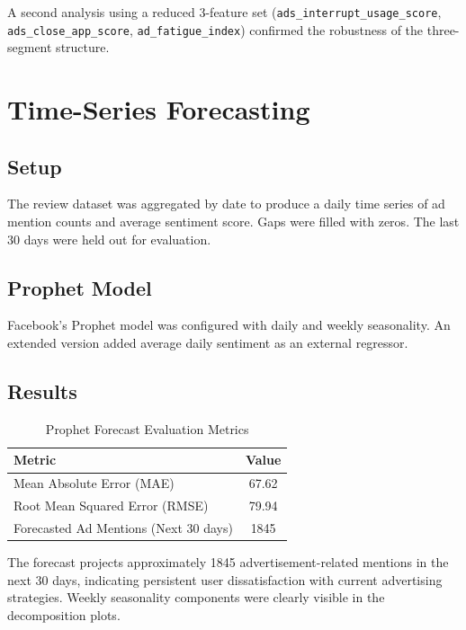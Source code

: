 \documentclass[12pt]{article}
\begin{document}
A second analysis using a reduced 3-feature set (\texttt{ads\_interrupt\_usage\_score}, \texttt{ads\_close\_app\_score}, \texttt{ad\_fatigue\_index}) confirmed the robustness of the three-segment structure.

\section{Time-Series Forecasting}

\subsection{Setup}

The review dataset was aggregated by date to produce a daily time series of ad mention counts and average sentiment score. Gaps were filled with zeros. The last 30 days were held out for evaluation.

\subsection{Prophet Model}

Facebook's Prophet model was configured with daily and weekly seasonality. An extended version added average daily sentiment as an external regressor.

\subsection{Results}

\begin{table}[H]
\centering
\begin{tabular}{lc}
\toprule
\textbf{Metric} & \textbf{Value} \\
\midrule
Mean Absolute Error (MAE)            & 67.62 \\
Root Mean Squared Error (RMSE)       & 79.94 \\
Forecasted Ad Mentions (Next 30 days) & 1845  \\
\bottomrule
\end{tabular}
\caption{Prophet Forecast Evaluation Metrics}
\label{tab:prophet_results}
\end{table}

The forecast projects approximately 1845 advertisement-related mentions in the next 30 days, indicating persistent user dissatisfaction with current advertising strategies. Weekly seasonality components were clearly visible in the decomposition plots.
\end{document}
